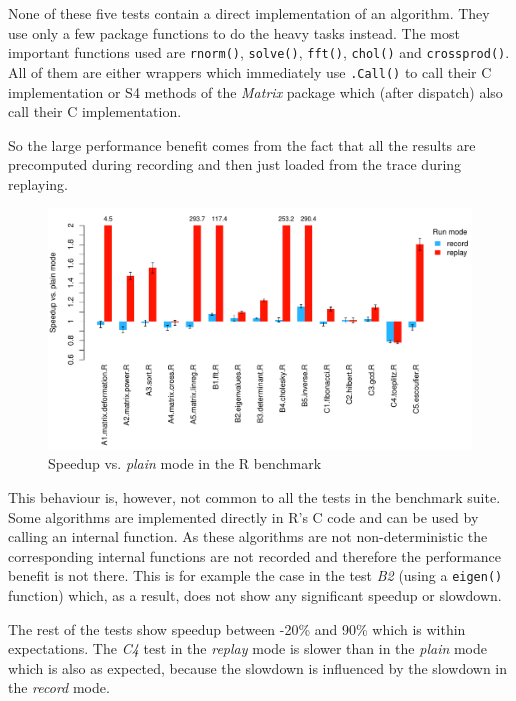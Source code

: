 \documentclass[thesis=M,english,hidelinks]{FITthesis}[2012/10/20]
\begin{document}
		None of these five tests contain a direct implementation of an algorithm. They use only a few package functions to do the heavy tasks instead. The most important functions used are \lstinline|rnorm()|, \lstinline|solve()|, \lstinline|fft()|, \lstinline|chol()| and \lstinline|crossprod()|. All of them are either wrappers which immediately use \lstinline|.Call()| to call their C implementation or S4 methods of the \emph{Matrix} package which (after dispatch) also call their C implementation.\par
		
		So the large performance benefit comes from the fact that all the results are precomputed during recording and then just loaded from the trace during replaying.\par
		
		\begin{figure}[ht]\centering
			\includegraphics[width=1.0\textwidth]{benchmarks/R-benchmark/plot_difference}
			\caption{Speedup vs. \emph{plain} mode in the R benchmark}\label{fig:rbench_difference}
		\end{figure}
		
		This behaviour is, however, not common to all the tests in the benchmark suite. Some algorithms are implemented directly in R's C code and can be used by calling an internal function. As these algorithms are not non-deterministic the corresponding internal functions are not recorded and therefore the performance benefit is not there. This is for example the case in the test \emph{B2} (using a \lstinline|eigen()| function) which, as a result, does not show any significant speedup or slowdown.\par
		
		The rest of the tests show speedup between -20\% and 90\% which is within expectations. The \emph{C4} test in the \emph{replay} mode is slower than in the \emph{plain} mode which is also as expected, because the slowdown is influenced by the slowdown in the \emph{record} mode. 
		
\end{document}
